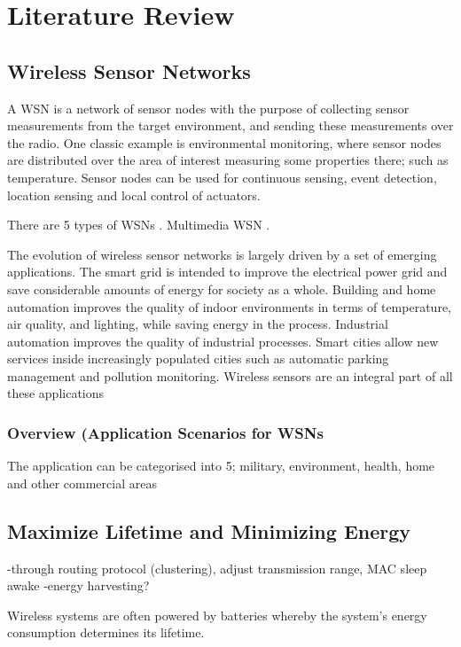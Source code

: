 \chapter{Literature Review}
\label{literatureReview}

\section{Wireless Sensor Networks}
A WSN is a network of sensor nodes with the purpose of collecting sensor measurements from the target environment, and sending these measurements over the radio. One classic example is environmental monitoring, where sensor nodes are distributed over the area of interest measuring some properties there; such as temperature.
Sensor nodes can be used for continuous sensing, event detection, location sensing and local control of actuators. 

There are 5 types of WSNs \cite{wsnSurvey1}.
Multimedia WSN \cite{wsnSurvey3}.

The evolution of wireless sensor networks is largely driven by a set of emerging applications. The smart grid is intended to improve the electrical power grid and save considerable amounts of energy for society as a whole. Building and home automation improves the quality of indoor environments in terms of temperature, air quality, and lighting, while saving energy in the process. Industrial automation improves the quality of industrial processes. Smart cities allow new services inside increasingly populated cities such as automatic parking management and pollution monitoring. Wireless sensors are an integral part of all these applications \cite{beyondInteroperability}

\subsection{Overview (Application Scenarios for WSNs}
The application can be categorised into 5; military, environment, health, home and other commercial areas \cite{wsnSurvey2}

\section{Maximize Lifetime and Minimizing Energy}
-through routing protocol (clustering), adjust transmission range, MAC sleep awake 
-energy harvesting?

Wireless systems are often powered by batteries whereby the system's energy consumption determines its lifetime.

